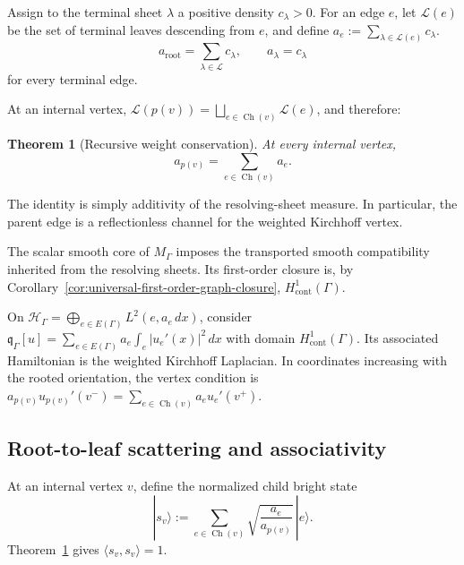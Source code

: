 \documentclass[11pt]{article}
\theoremstyle{plain}
\newtheorem{theorem}{Theorem}[section]
\theoremstyle{definition}
\begin{document}
Assign to the terminal sheet \(\lambda\) a positive density
\(c_\lambda>0\).
For an edge \(e\), let \(\mathcal L(e)\) be the set of terminal leaves descending from \(e\), and define
\(a_e := \sum_{\lambda\in\mathcal L(e)} c_\lambda\).
\[
  a_{\mathrm{root}}
  =
  \sum_{\lambda\in\mathcal L}c_\lambda,
  \qquad
  a_\lambda=c_\lambda
\]
for every terminal edge.

At an internal vertex,
\(\mathcal L(p(v)) = \bigsqcup_{e\in\operatorname{Ch}(v)} \mathcal L(e)\),
and therefore:

\begin{theorem}[Recursive weight conservation]
\label{thm:trees-weight-conservation}
At every internal vertex,
\[
  a_{p(v)}
  =
  \sum_{e\in\operatorname{Ch}(v)}
  a_e.
\]
\end{theorem}

The identity is simply additivity of the resolving-sheet measure. In
particular, the parent edge is a reflectionless channel for the weighted
Kirchhoff vertex.

The scalar smooth core of \(M_\Gamma\) imposes the transported smooth
compatibility inherited from the resolving sheets. Its first-order closure
is, by Corollary~\ref{cor:universal-first-order-graph-closure},
\(H^1_{\mathrm{cont}}(\Gamma)\).

On
\(\mathcal H_\Gamma = \bigoplus_{e\in E(\Gamma)} L^2(e,a_e\,dx)\),
consider \(\mathfrak q_\Gamma[u] = \sum_{e\in E(\Gamma)} a_e \int_e|u_e'(x)|^2\,dx\) with domain
\(H^1_{\mathrm{cont}}(\Gamma)\).
Its associated Hamiltonian is the weighted Kirchhoff Laplacian. In
coordinates increasing with the rooted orientation, the vertex condition is
\(a_{p(v)}u_{p(v)}'(v^-) = \sum_{e\in\operatorname{Ch}(v)} a_eu_e'(v^+)\).

\subsection{Root-to-leaf scattering and associativity}
\label{subsec:trees-local-bright}
\label{subsec:trees-global-reflectionless}
\label{subsec:trees-associativity}
\label{subsec:trees-equal-leaves}

At an internal vertex \(v\), define the normalized child bright state
\[
  |s_v\rangle
  :=
  \sum_{e\in\operatorname{Ch}(v)}
  \sqrt{\frac{a_e}{a_{p(v)}}}\,
  |e\rangle.
\]
Theorem~\ref{thm:trees-weight-conservation} gives
\(\langle s_v,s_v\rangle=1\).
\end{document}
